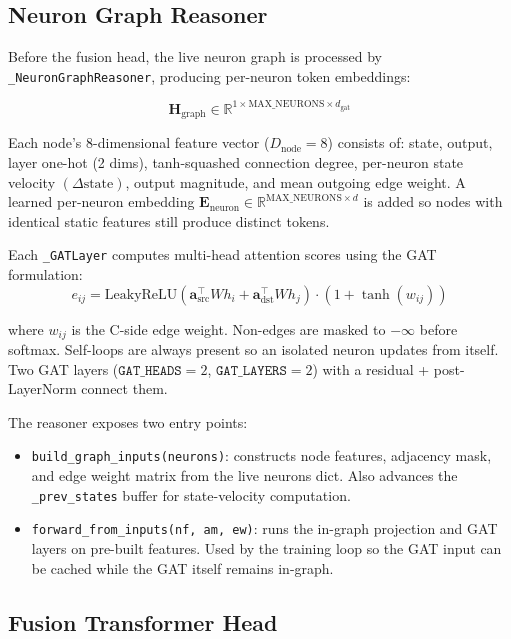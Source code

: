 \documentclass[12pt]{article}
\begin{document}
\subsection{Neuron Graph Reasoner}

Before the fusion head, the live neuron graph is processed by
\texttt{\_NeuronGraphReasoner}, producing per-neuron token embeddings:

\[
  \mathbf{H}_{\text{graph}} \in
    \mathbb{R}^{1 \times \text{MAX\_NEURONS} \times d_{\text{gat}}}
\]

Each node's 8-dimensional feature vector ($D_{\text{node}} = 8$)
consists of: state, output, layer one-hot (2 dims), tanh-squashed
connection degree, per-neuron state velocity $(\Delta\text{state})$,
output magnitude, and mean outgoing edge weight. A learned per-neuron
embedding $\mathbf{E}_{\text{neuron}} \in
\mathbb{R}^{\text{MAX\_NEURONS} \times d}$ is added so nodes with
identical static features still produce distinct tokens.

Each \texttt{\_GATLayer} computes multi-head attention scores using the
GAT formulation:
\[
  e_{ij} = \text{LeakyReLU}\!\left(
    \mathbf{a}_{\text{src}}^\top W h_i +
    \mathbf{a}_{\text{dst}}^\top W h_j
  \right) \cdot (1 + \tanh(w_{ij}))
\]

where $w_{ij}$ is the C-side edge weight. Non-edges are masked to
$-\infty$ before softmax. Self-loops are always present so an isolated
neuron updates from itself. Two GAT layers ($\texttt{GAT\_HEADS}=2$,
$\texttt{GAT\_LAYERS}=2$) with a residual + post-LayerNorm connect them.

The reasoner exposes two entry points:
\begin{itemize}
  \item \texttt{build\_graph\_inputs(neurons)}: constructs node features,
    adjacency mask, and edge weight matrix from the live neurons dict.
    Also advances the \texttt{\_prev\_states} buffer for state-velocity
    computation.
  \item \texttt{forward\_from\_inputs(nf, am, ew)}: runs the in-graph
    projection and GAT layers on pre-built features. Used by the training
    loop so the GAT input can be cached while the GAT itself remains
    in-graph.
\end{itemize}

\subsection{Fusion Transformer Head}
\end{document}
